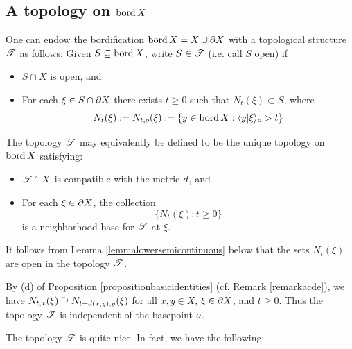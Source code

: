 \subsection{A topology on $\operatorname{bord} X$}
\label{subsubsectiontopologyclX}
One can endow the bordification $\operatorname{bord} X = X\cup\partial X$ with a topological structure $\mathscr T$ as follows: Given $S\subseteq\operatorname{bord} X$, write $S\in\mathscr T$ (i.e. call $S$ open) if
\begin{itemize}
\item[(I)] $S\cap X$ is open, and
\item[(II)] For each $\xi\in S\cap\partial X$ there exists $t\geq 0$ such that $N_t(\xi)\subset S$, where
\[
N_t(\xi) := N_{t,o}(\xi) := \{y\in \operatorname{bord} X:\langle y|\xi\rangle_o > t\}
\]
\end{itemize}

\begin{remark}
The topology $\mathscr T$ may equivalently be defined to be the unique topology on $\operatorname{bord} X$ satisfying:
\begin{itemize}
\item[(I)] $\mathscr T\upharpoonleft X$ is compatible with the metric $d$, and
\item[(II)] For each $\xi\in\partial X$, the collection
\begin{equation}
\label{Ntxibase}
\{N_t(\xi) : t \geq 0\}
\end{equation}
is a neighborhood base for $\mathscr T$ at $\xi$.
\end{itemize}
\end{remark}

\begin{remark}
\label{remarkNtxiopen}
It follows from Lemma \ref{lemmalowersemicontinuous} below that the sets $N_t(\xi)$ are open in the topology $\mathscr T$.
\end{remark}

\begin{remark}
\label{remarkbasepoint2}
By (d) of Proposition \ref{propositionbasicidentities} (cf. Remark \ref{remarkacde}), we have $N_{t,x}(\xi) \supseteq N_{t + d(x,y),y}(\xi)$ for all $x,y\in X$, $\xi\in\partial X$, and $t\geq 0$. Thus the topology $\mathscr T$ is independent of the basepoint $o$.
\end{remark}

The topology $\mathscr T$ is quite nice. In fact, we have the following:

